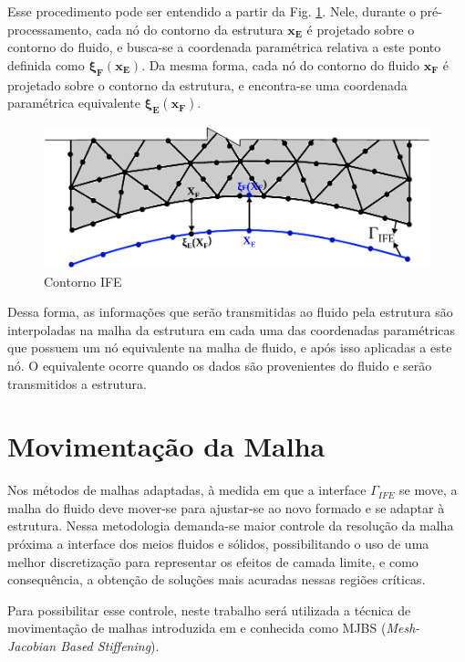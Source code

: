 \documentclass[tese_patricia]{subfiles}
\begin{document}
Esse procedimento pode ser entendido a partir da Fig. \ref{fig:contornoIFE}. Nele, durante o pré-processamento, cada nó do contorno da estrutura $\mathbf{x_E}$ é projetado sobre o contorno do fluido, e busca-se a coordenada paramétrica relativa a este ponto definida como $\boldsymbol{\xi_{F}}(\mathbf{x_E})$. Da mesma forma, cada nó do contorno do fluido $\mathbf{x_F}$ é projetado sobre o contorno da estrutura, e encontra-se uma coordenada paramétrica equivalente $\boldsymbol{\xi_{E}}(\mathbf{x_F})$. 


\begin{figure}[htb!]
	\centering 
	\includegraphics[scale=0.9,trim=0cm 0cm 0cm 0cm, clip=true]{Imagens/Cap5/contornoIFE.pdf}	
	\caption{Contorno IFE}
	\label{fig:contornoIFE}
\end{figure}

Dessa forma, as informações que serão transmitidas ao fluido pela estrutura são interpoladas na malha da estrutura em cada uma das coordenadas paramétricas que possuem um nó equivalente na malha de fluido, e após isso aplicadas a este nó. O equivalente ocorre quando os dados são provenientes do fluido e serão transmitidos a estrutura.

\section{Movimentação da Malha}

Nos métodos de malhas adaptadas, à medida em que a interface $\Gamma_{IFE}$ se move, a malha do fluido deve mover-se para ajustar-se ao novo formado e se adaptar à estrutura. Nessa metodologia demanda-se maior controle da resolução da malha próxima a interface dos meios fluidos e sólidos, possibilitando o uso de uma melhor discretização para representar os efeitos de camada limite, e como consequência, a obtenção de soluções mais acuradas nessas regiões críticas.

Para possibilitar esse controle, neste trabalho será utilizada a técnica de movimentação de malhas introduzida em  e  conhecida como MJBS (\textit{Mesh-Jacobian Based Stiffening}).
\end{document}
